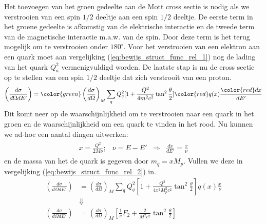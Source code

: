 \documentclass[../main.tex]{subfiles}
\begin{document}
Het toevoegen van het groen gedeelte aan de Mott cross sectie is nodig als we verstrooien van een spin $1/2$ deeltje aan een spin $1/2$ deeltje. De eerste term in het groene gedeelte is afkomstig van de elektrische interactie en de tweede term van de magnetische interactie m.a.w. van de spin. Door deze term is het terug mogelijk om te verstrooien onder $180^\circ$. Voor het verstrooien van een elektron aan een quark moet aan vergelijking (\ref{eq:bewijs_struct_func_rel_1}) nog de lading van het quark $Q_a^2$ vermenigvuldigd worden. De laatste stap is nu de cross sectie op te stellen van een spin $1/2$ deeltje dat zich verstrooit van een proton.
\begin{equation}
    \begin{aligned}
        \label{eq:bewijs_struct_func_rel_2}
        \left(\frac{d\sigma}{d\Omega dE'}\right) = {\color{green} \left(\frac{d\sigma}{d\Omega}\right)_{M} \sum_q Q_q^2 [1+ \frac{Q^2}{4m^2c^2} \tan^2 \frac{\theta}{2}]} {\color{red}q(x)} \frac{{\color{red}dx}}{dE'} 
    \end{aligned}
\end{equation}
Dit komt neer op de waarschijnlijkheid om te verstrooien naar een quark in het groen en de waarschijnlijkheid om een quark te vinden in het rood. Nu kunnen we ad-hoc een aantal dingen uitwerken:
\begin{equation}
    \begin{aligned}
        \label{eq:bewijs_struct_func_rel_3}
        \begin{matrix}
            x = \frac{Q^2}{2M\nu}; & \nu = E-E' & \Rightarrow & \frac{dx}{dE'} = \frac{x}{\nu} 
        \end{matrix}
    \end{aligned}
\end{equation}
en de massa van het de quark is gegeven door $m_q = xM_p$. Vullen we deze in vergelijking (\ref{eq:bewijs_struct_func_rel_2}) in.
\begin{equation}
    \begin{aligned}
        \label{eq:bewijs_struct_func_rel_4}
        \left(\frac{d\sigma}{d\Omega dE'}\right) &= \left(\frac{d\sigma}{d\Omega}\right)_{M} \sum_q Q_q^2 [1+ \frac{Q^2}{4x^2M_p^2c^2} \tan^2 \frac{\theta}{2}]q(x) \frac{x}{\nu}\\
                                                 &\Downarrow\\
        \left(\frac{d\sigma}{d\Omega dE'}\right) &= \left(\frac{d\sigma}{d\Omega}\right)_{M} \left[ \frac{1}{\nu} F_2 + \frac{2}{M^2c^2} \tan^2 \frac{\theta}{2} \right]
    \end{aligned}
\end{equation}
\end{document}
